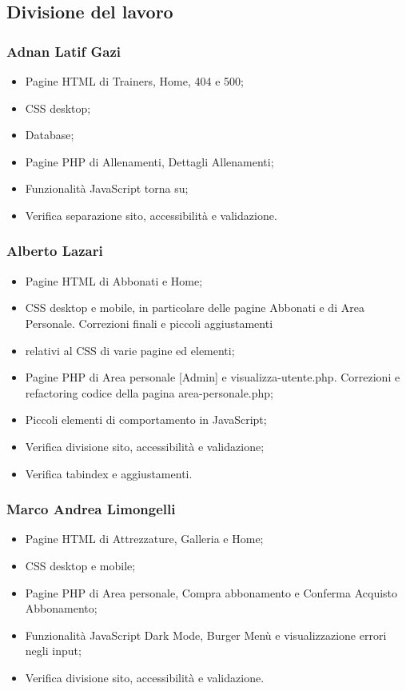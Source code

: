 \documentclass[a4paper]{article}
\begin{document}
	\subsection{Divisione del lavoro}

	\subsubsection{Adnan Latif Gazi}
	\begin{itemize}
		\item Pagine HTML di Trainers, Home, 404 e 500;
		\item CSS desktop;
		\item Database;
		\item Pagine PHP di Allenamenti, Dettagli Allenamenti;
		\item Funzionalità JavaScript torna su;
		\item Verifica separazione sito, accessibilità e validazione.
	\end{itemize}

	\subsubsection{Alberto Lazari}
	\begin{itemize}
		\item Pagine HTML di Abbonati e Home;
		\item CSS desktop e mobile, in particolare delle pagine Abbonati e di Area Personale. Correzioni finali e piccoli aggiustamenti \item relativi al CSS di varie pagine ed elementi;
		\item Pagine PHP di Area personale [Admin] e visualizza-utente.php. Correzioni e refactoring codice della pagina area-personale.php;
		\item Piccoli elementi di comportamento in JavaScript;
		\item Verifica divisione sito, accessibilità e validazione;
		\item Verifica tabindex e aggiustamenti.
	\end{itemize}

	\subsubsection{Marco Andrea Limongelli}
	\begin{itemize}
		\item Pagine HTML di Attrezzature, Galleria e Home;
		\item CSS desktop e mobile;
		\item Pagine PHP di Area personale, Compra abbonamento e Conferma Acquisto Abbonamento;
		\item Funzionalità JavaScript Dark Mode, Burger Menù e visualizzazione errori negli input;
		\item Verifica divisione sito, accessibilità e validazione.    
	\end{itemize}
\end{document}
